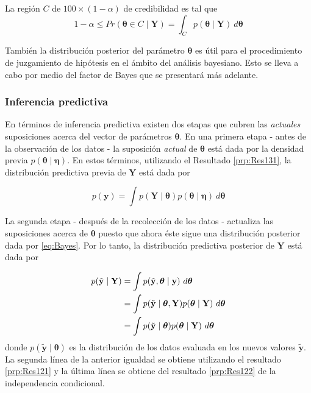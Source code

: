 \documentclass[
  10pt,
  spanish,
]{book}
\theoremstyle{definition}
\theoremstyle{definition}
\theoremstyle{definition}
\theoremstyle{definition}
\theoremstyle{remark}
\begin{document}
La región \(C\) de \(100\times(1-\alpha)%
\) de credibilidad es tal que
\begin{equation}
1-\alpha \leq Pr(\boldsymbol \theta\in C \mid \mathbf{Y})=\int_Cp(\boldsymbol \theta\mid \mathbf{Y})\ d\boldsymbol \theta
\end{equation}

También la distribución posterior del parámetro \(\boldsymbol \theta\) es útil para
el procedimiento de juzgamiento de hipótesis en el ámbito del análisis
bayesiano. Esto se lleva a cabo por medio del factor de Bayes que se
presentará más adelante.

\hypertarget{inferencia-predictiva}{%
\subsubsection*{Inferencia predictiva}\label{inferencia-predictiva}}

En términos de inferencia predictiva existen dos etapas que cubren las
\emph{actuales} suposiciones acerca del vector de parámetros \(\boldsymbol \theta\).
En una primera etapa - antes de la observación de los datos - la
suposición \emph{actual} de \(\boldsymbol \theta\) está dada por la densidad
previa \(p(\boldsymbol \theta\mid \boldsymbol \eta)\). En estos términos, utilizando el
Resultado \ref{prp:Res131}, la distribución predictiva previa de
\(\mathbf{Y}\) está dada por

\begin{equation}
p(\mathbf{y})=\int p(\mathbf{Y} \mid \boldsymbol \theta)p(\boldsymbol \theta\mid \boldsymbol \eta)\ d\boldsymbol \theta
\end{equation}

La segunda etapa - después de la recolección de los datos - actualiza
las suposiciones acerca de \(\boldsymbol \theta\) puesto que ahora éste sigue una
distribución posterior dada por \eqref{eq:Bayes}. Por lo tanto, la
distribución predictiva posterior de \(\mathbf{Y}\) está dada por

\begin{align}
\label{eq:predictpos}
p(\tilde{\mathbf{y}} \mid \mathbf{Y})&=\int p(\tilde{\mathbf{y}},\boldsymbol \theta\mid \mathbf{y})\ d\boldsymbol \theta\notag \\
&=\int p(\tilde{\mathbf{y}} \mid \boldsymbol \theta,\mathbf{Y})p(\boldsymbol \theta\mid \mathbf{Y})\ d\boldsymbol \theta\notag \\
&=\int p(\tilde{\mathbf{y}} \mid \boldsymbol \theta)p(\boldsymbol \theta\mid \mathbf{Y})\ d\boldsymbol \theta
\end{align} donde \(p(\tilde{\mathbf{y}} \mid \boldsymbol \theta)\) es la
distribución de los datos evaluada en los nuevos valores
\(\tilde{\mathbf{y}}\). La segunda línea de la anterior igualdad se
obtiene utilizando el resultado \ref{prp:Res121} y la última línea se
obtiene del resultado \ref{prp:Res122} de la independencia condicional.
\end{document}
